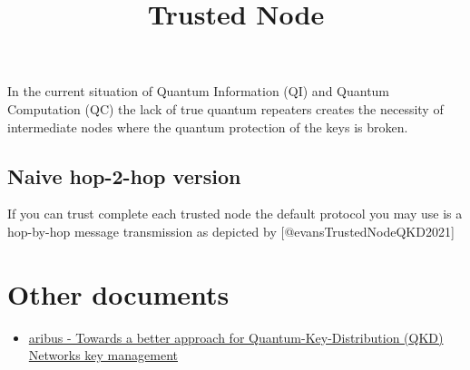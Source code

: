 \documentclass[
]{article}
\title{Trusted Node}
\author{}
\date{}
\providecommand{\tightlist}{%
  \setlength{\itemsep}{0pt}\setlength{\parskip}{0pt}}
\begin{document}
\maketitle

In the current situation of Quantum Information (QI) and Quantum
Computation (QC) the lack of true quantum repeaters creates the
necessity of intermediate nodes where the quantum protection of the keys
is broken.

\subsection{Naive hop-2-hop version}\label{naive-hop-2-hop-version}

If you can trust complete each trusted node the default protocol you may
use is a hop-by-hop message transmission as depicted by
{[}@evansTrustedNodeQKD2021{]}

\section{Other documents}\label{other-documents}

\begin{itemize}
\tightlist
\item
  \href{https://securecommunications.airbus.com/en/newsroom/news/2023-04-towards-a-better-approach-for-quantum-key-distribution-qkd-networks-key}{aribus
  - Towards a better approach for Quantum-Key-Distribution (QKD)
  Networks key management}
\end{itemize}
\end{document}
